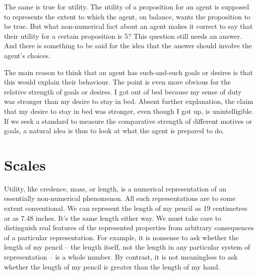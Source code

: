 The same is true for utility. The utility of a proposition for an agent is
supposed to represents the extent to which the agent, on balance, wants the
proposition to be true. But what non-numerical fact about an agent makes it
correct to say that their utility for a certain proposition is 5? This question
still needs an answer. And there is something to be said for the idea that the
answer should involve the agent's choices.


The main reason to think that an agent has such-and-such goals or desires is
that this would explain their behaviour. The point is even more obvious for the
relative strength of goals or desires. I got out of bed because my sense of duty
was stronger than my desire to stay in bed. Absent further explanation, the
claim that my desire to stay in bed was stronger, even though I got up, is
unintelligible. If we seek a standard to measure the comparative strength of
different motives or goals, a natural idea is thus to look at what the agent is
prepared to do.

\section{Scales}

Utility, like credence, mass, or length, is a numerical representation of an
essentially non-numerical phenomenon. All such representations are to some
extent conventional. We can represent the length of my pencil as 19 centimetres
or as 7.48 inches. It's the same length either way. We must take care to
distinguish real features of the represented properties from arbitrary
consequences of a particular representation. For example, it is nonsense to ask
whether the length of my pencil -- the length itself, not the length in any
particular system of representation -- is a whole number. By contrast, it is not
meaningless to ask whether the length of my pencil is greater than the length of
my hand.

